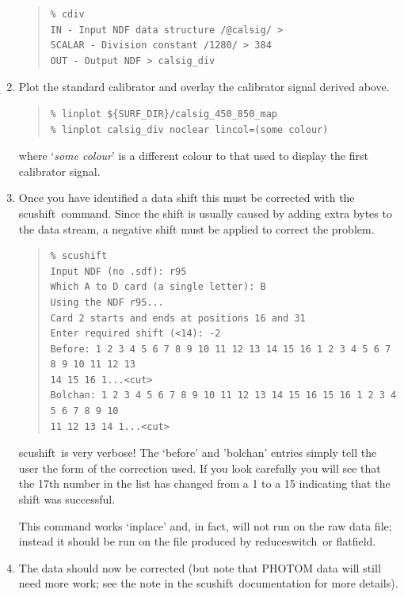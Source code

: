 \documentclass[twoside,11pt]{article}
\newcommand{\task}[1]{{\sf #1}}
\newcommand{\resw}{\htmlref{\task{reduce\_switch}}{REDUCE_SWITCH}}
\newcommand{\flatf}{\htmlref{\task{flatfield}}{FLATFIELD}}
\newcommand{\scushift}{\htmlref{\task{scushift}}{SCUSHIFT}}
\newenvironment{myquote}{\begin{quote}\begin{small}}{\end{small}\end{quote}}
\newcommand{\htmlref}[2]{#1}
\renewcommand{\_}{\texttt{\symbol{95}}}
\begin{document}
\begin{enumerate}
\begin{myquote}
\begin{verbatim}
% cdiv
IN - Input NDF data structure /@calsig/ > 
SCALAR - Division constant /1280/ > 384
OUT - Output NDF > calsig_div
\end{verbatim}
\end{myquote}

\item Plot the standard calibrator and overlay the calibrator signal derived
above. 

\begin{myquote}
\begin{verbatim}
% linplot ${SURF_DIR}/calsig_450_850_map
% linplot calsig_div noclear lincol=(some colour)
\end{verbatim}
\end{myquote}
where `\textit{some colour}' is a different colour to that used to display
the first calibrator signal.

\item Once you have identified a data shift this must be corrected with the
\scushift\ command. Since the shift is usually caused by adding extra bytes to 
the data stream, a negative shift must be applied to correct the problem.

\begin{myquote}
\begin{verbatim}
% scushift
Input NDF (no .sdf): r95
Which A to D card (a single letter): B
Using the NDF r95...
Card 2 starts and ends at positions 16 and 31
Enter required shift (<14): -2
Before: 1 2 3 4 5 6 7 8 9 10 11 12 13 14 15 16 1 2 3 4 5 6 7 8 9 10 11 12 13 
14 15 16 1...<cut>
Bolchan: 1 2 3 4 5 6 7 8 9 10 11 12 13 14 15 16 15 16 1 2 3 4 5 6 7 8 9 10 
11 12 13 14 1...<cut>
\end{verbatim}
\end{myquote}
\scushift\ is very verbose! The `before' and 'bolchan' entries simply tell the
user the form of the correction used. If you look carefully you will see
 that the 17th number in the list has changed from a 1 to a 15 indicating that 
the shift was successful.

This command works `inplace' and, in fact, will not run on the raw data file;
instead it should be run on the file produced by \resw\ or \flatf.

\item The data should now be corrected (but note that PHOTOM data will still
need more work; see the note in the \scushift\ documentation for more details).

\end{enumerate}
\end{document}
